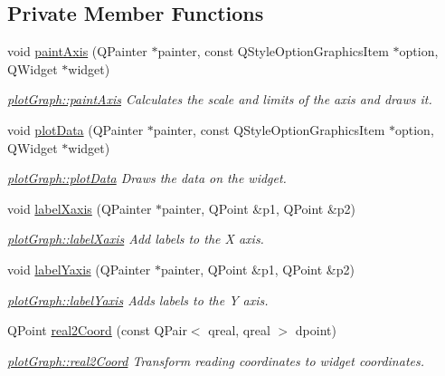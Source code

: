 \subsection*{Private Member Functions}
\begin{DoxyCompactItemize}
\item 
void \hyperlink{classplot_graph_a9237c8835c854dfe3156d4a5803663ab}{paint\-Axis} (Q\-Painter $\ast$painter, const Q\-Style\-Option\-Graphics\-Item $\ast$option, Q\-Widget $\ast$widget)
\begin{DoxyCompactList}\small\item\em \hyperlink{classplot_graph_a9237c8835c854dfe3156d4a5803663ab}{plot\-Graph\-::paint\-Axis} Calculates the scale and limits of the axis and draws it. \end{DoxyCompactList}\item 
void \hyperlink{classplot_graph_a15feece3d49379208e40d2cd1b560787}{plot\-Data} (Q\-Painter $\ast$painter, const Q\-Style\-Option\-Graphics\-Item $\ast$option, Q\-Widget $\ast$widget)
\begin{DoxyCompactList}\small\item\em \hyperlink{classplot_graph_a15feece3d49379208e40d2cd1b560787}{plot\-Graph\-::plot\-Data} Draws the data on the widget. \end{DoxyCompactList}\item 
void \hyperlink{classplot_graph_aafb4adc423d484284f192dee28b00b8a}{label\-Xaxis} (Q\-Painter $\ast$painter, Q\-Point \&p1, Q\-Point \&p2)
\begin{DoxyCompactList}\small\item\em \hyperlink{classplot_graph_aafb4adc423d484284f192dee28b00b8a}{plot\-Graph\-::label\-Xaxis} Add labels to the X axis. \end{DoxyCompactList}\item 
void \hyperlink{classplot_graph_a101e15e7b8cb1ca251e736777a091ee3}{label\-Yaxis} (Q\-Painter $\ast$painter, Q\-Point \&p1, Q\-Point \&p2)
\begin{DoxyCompactList}\small\item\em \hyperlink{classplot_graph_a101e15e7b8cb1ca251e736777a091ee3}{plot\-Graph\-::label\-Yaxis} Adds labels to the Y axis. \end{DoxyCompactList}\item 
Q\-Point \hyperlink{classplot_graph_afecabc6fb684c043bef8f585eb7e0791}{real2\-Coord} (const Q\-Pair$<$ qreal, qreal $>$ dpoint)
\begin{DoxyCompactList}\small\item\em \hyperlink{classplot_graph_afecabc6fb684c043bef8f585eb7e0791}{plot\-Graph\-::real2\-Coord} Transform reading coordinates to widget coordinates. \end{DoxyCompactList}\end{DoxyCompactItemize}
